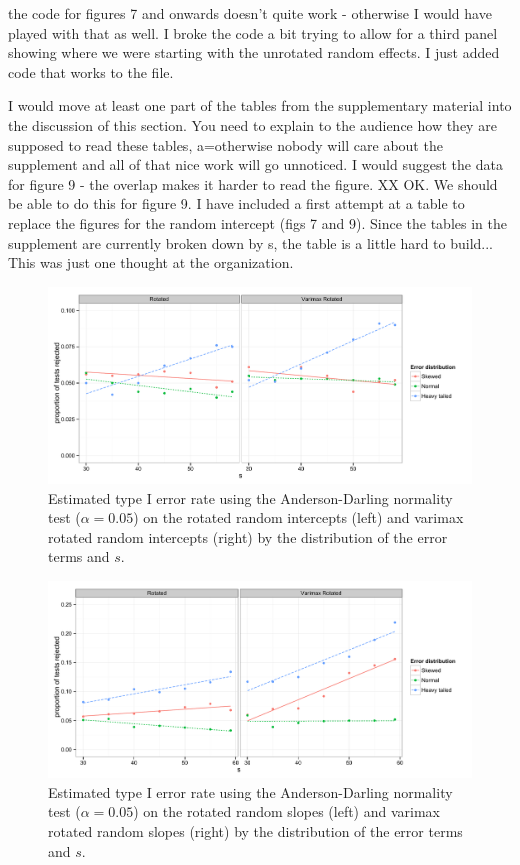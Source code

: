 \documentclass[12pt]{article} %
\newcommand{\hh}[1]{{\color{orange} #1}}
\newcommand{\al}[1]{{\color{red} #1}}
\begin{document}
\hh{the code for figures 7 and onwards doesn't quite work - otherwise I would have played with that as well. }
\al{I broke the code a bit trying to allow for a third panel showing where we were starting with the unrotated random effects. I just added code that works to the file.}

\hh{I would move at least one part of the tables from the supplementary material into the discussion of this section. You need to explain to the audience how they are supposed to read these tables, a=otherwise nobody will care about the supplement and all of that nice work will go unnoticed. I would suggest the data for figure 9 - the overlap makes it harder to read the figure. }
\al{XX OK. We should be able to do this for figure 9. I have included a first attempt at a table to replace the figures for the random intercept (figs 7 and 9). Since the tables in the supplement are currently broken down by s, the table is a little hard to build... This was just one thought at the organization.}

\begin{figure}
	\centering
	\includegraphics[width=\textwidth]{ad_intercept_results.pdf}
	\caption{\label{fig:results-int} Estimated type I error rate using the Anderson-Darling normality test ($\alpha = 0.05$) on the rotated random intercepts (left) and varimax rotated random intercepts (right) by the distribution of the error terms and $s$. }
\end{figure}

\begin{figure}
	\centering
	\includegraphics[width=\textwidth]{ad_slope_results.pdf}
	\caption{\label{fig:results-slope} Estimated type I error rate using the Anderson-Darling normality test ($\alpha = 0.05$) on the rotated random slopes (left) and varimax rotated random slopes (right) by the distribution of the error terms and $s$.}
\end{figure}
\end{document}

